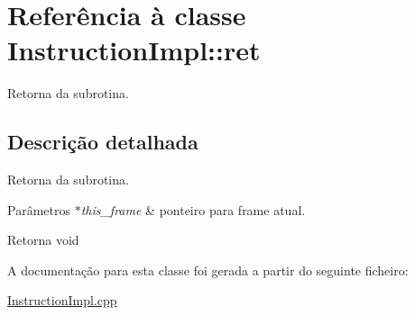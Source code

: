 \hypertarget{class_instruction_impl_1_1ret}{}\section{Referência à classe Instruction\+Impl\+:\+:ret}
\label{class_instruction_impl_1_1ret}


Retorna da subrotina.  




\subsection{Descrição detalhada}
Retorna da subrotina. 


\begin{DoxyParams}{Parâmetros}
{\em $\ast$this\+\_\+frame} & ponteiro para frame atual. \\
\hline
\end{DoxyParams}
\begin{DoxyReturn}{Retorna}
void 
\end{DoxyReturn}


A documentação para esta classe foi gerada a partir do seguinte ficheiro\+:\begin{DoxyCompactItemize}
\item 
\hyperlink{_instruction_impl_8cpp}{Instruction\+Impl.\+cpp}\end{DoxyCompactItemize}
